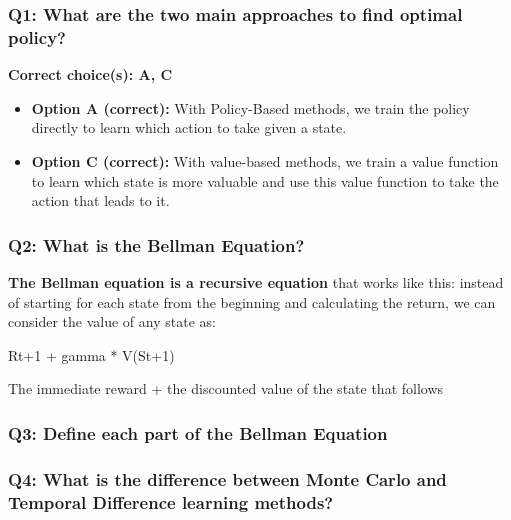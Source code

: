 \documentclass[11pt,a4paper]{article}
\begin{document}
\subsubsection{Q1: What are the two main approaches to find optimal policy?}\label{q1-what-are-the-two-main-approaches-to-find-optimal-policy-1}

\textbf{Correct choice(s): A, C}

\begin{itemize}
\item
  \textbf{Option A (correct):} With Policy-Based methods, we train the policy directly to learn which action to take given a state.
\item
  \textbf{Option C (correct):} With value-based methods, we train a value function to learn which state is more valuable and use this value function to take the action that leads to it.
\end{itemize}

\subsubsection{Q2: What is the Bellman Equation?}\label{q2-what-is-the-bellman-equation-1}

\textbf{The Bellman equation is a recursive equation} that works like this: instead of starting for each state from the beginning and calculating the return, we can consider the value of any state as:

Rt+1 + gamma * V(St+1)

The immediate reward + the discounted value of the state that follows

\subsubsection{Q3: Define each part of the Bellman Equation}\label{q3-define-each-part-of-the-bellman-equation-1}


\subsubsection{Q4: What is the difference between Monte Carlo and Temporal Difference learning methods?}\label{q4-what-is-the-difference-between-monte-carlo-and-temporal-difference-learning-methods-1}
\end{document}
